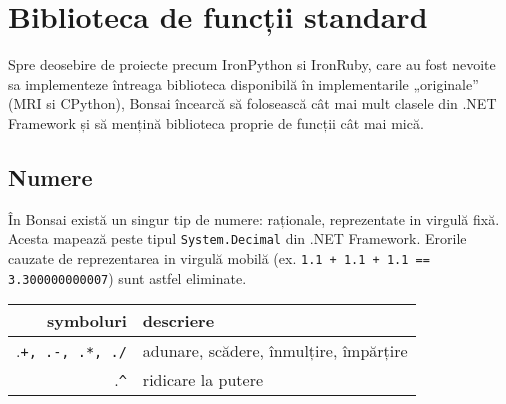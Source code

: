 \documentclass[12pt,a4paper]{memoir}
\begin{document}
\section{}

\section{}

\section{}

\section{}

\chapter{Biblioteca de funcții standard}

Spre deosebire de proiecte precum IronPython si IronRuby, care au fost nevoite sa implementeze întreaga biblioteca disponibilă în implementarile „originale” (MRI\cite{ruby_mri} si CPython\cite{cpython}), Bonsai încearcă să folosească cât mai mult clasele din .NET Framework și să mențină biblioteca proprie de funcții cât mai mică.

\section{Numere}

În Bonsai există un singur tip de numere: raționale, reprezentate in virgulă fixă. Acesta mapează peste tipul \texttt{System.Decimal} din .NET Framework. Erorile cauzate de reprezentarea in virgulă mobilă (ex. \texttt{1.1 + 1.1 + 1.1 == 3.300000000007}) sunt astfel eliminate.

\begin{tabular} { | r | l | }
  \hline
  symboluri & descriere \\
  \hline
  .\texttt{+, .-, .*, ./} & adunare, scădere, înmulțire, împărțire \\
  .\texttt{\textasciicircum} & ridicare la putere \\
  \hline
\end{tabular}
\end{document}
